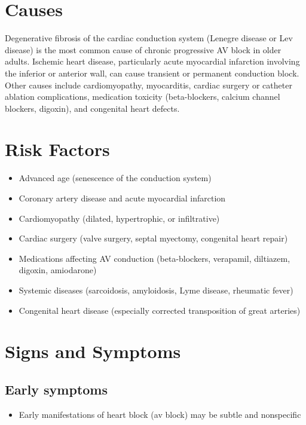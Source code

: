 \section{Causes}
Degenerative fibrosis of the cardiac conduction system (Lenegre disease or Lev disease) is the most common cause of chronic progressive AV block in older adults. Ischemic heart disease, particularly acute myocardial infarction involving the inferior or anterior wall, can cause transient or permanent conduction block. Other causes include cardiomyopathy, myocarditis, cardiac surgery or catheter ablation complications, medication toxicity (beta-blockers, calcium channel blockers, digoxin), and congenital heart defects.

\section{Risk Factors}

\begin{itemize}[noitemsep]
  \item Advanced age (senescence of the conduction system)
  \item Coronary artery disease and acute myocardial infarction
  \item Cardiomyopathy (dilated, hypertrophic, or infiltrative)
  \item Cardiac surgery (valve surgery, septal myectomy, congenital heart repair)
  \item Medications affecting AV conduction (beta-blockers, verapamil, diltiazem, digoxin, amiodarone)
  \item Systemic diseases (sarcoidosis, amyloidosis, Lyme disease, rheumatic fever)
  \item Congenital heart disease (especially corrected transposition of great arteries)
\end{itemize}

\section{Signs and Symptoms}

\subsection{Early symptoms}
\begin{itemize}[noitemsep]
  \item Early manifestations of heart block (av block) may be subtle and nonspecific
\end{itemize}

